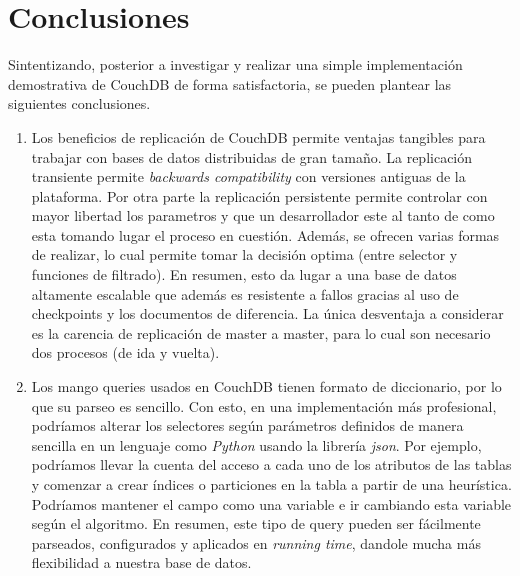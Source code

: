 \documentclass{article}
\begin{document}
    \section{Conclusiones}
        Sintentizando, posterior a investigar y realizar una simple implementación demostrativa de CouchDB de forma satisfactoria, se pueden plantear las siguientes conclusiones.
        \begin{enumerate}
            \item Los beneficios de replicación de CouchDB permite ventajas tangibles para trabajar con bases de datos distribuidas de gran tamaño. La replicación transiente permite \textit{backwards compatibility} con versiones antiguas de la plataforma. Por otra parte la replicación persistente permite controlar con mayor libertad los parametros y que un desarrollador este al tanto de como esta tomando lugar el proceso en cuestión. Además, se ofrecen varias formas de realizar, lo cual permite tomar la decisión optima (entre selector y funciones de filtrado). En resumen, esto da lugar a una base de datos altamente escalable que además es resistente a fallos gracias al uso de checkpoints y los documentos de diferencia. La única desventaja a considerar es la carencia de replicación de master a master, para lo cual son necesario dos procesos (de ida y vuelta).
            \item Los mango queries usados en CouchDB tienen formato de diccionario, por lo que su parseo es sencillo. Con esto, en una implementación más profesional, podríamos alterar los selectores según parámetros definidos de manera sencilla en un lenguaje como \textit{Python} usando la librería \textit{json}. Por ejemplo, podríamos llevar la cuenta del acceso a cada uno de los atributos de las tablas y comenzar a crear índices o particiones en la tabla a partir de una heurística. Podríamos mantener el campo como una variable e ir cambiando esta variable según el algoritmo. En resumen, este tipo de query pueden ser fácilmente parseados, configurados y aplicados en \textit{running time}, dandole mucha más flexibilidad a nuestra base de datos.
        \end{enumerate}
    \newpage

    
    
\end{document}
